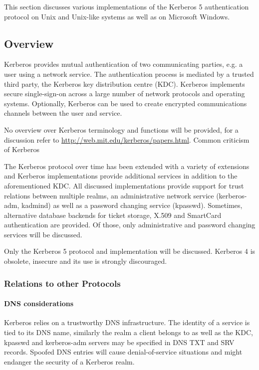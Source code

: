 This section discusses various implementations of the Kerberos 5 authentication protocol
on Unix and Unix-like systems as well as on Microsoft Windows. 

\subsection{Overview}
\label{subsection:kerberos_overview}

Kerberos provides mutual authentication of two communicating parties, e.g. a user using a network service. The authentication process is mediated by a trusted third party, the Kerberos key distribution centre (KDC). Kerberos implements secure single-sign-on across a large number of network protocols and operating systems. Optionally, Kerberos can be used to create encrypted communications channels between the user and service.

No overview over Kerberos terminology and functions will be provided, for a discussion refer to \url{http://web.mit.edu/kerberos/papers.html}. Common criticism of Kerberos 


The Kerberos protocol over time has been extended with a variety of extensions and Kerberos implementations provide additional services in addition to the aforementioned KDC. All discussed implementations provide support for trust relations between multiple realms, an administrative network service (kerberos-adm, kadmind) as well as a password changing service (kpasswd). Sometimes, alternative database backends for ticket storage, X.509 and SmartCard authentication are provided. Of those, only administrative and password changing services will be discussed.

Only the Kerberos 5 protocol and implementation will be discussed. Kerberos 4 is obsolete, insecure and its use is strongly discouraged.

\subsubsection{Relations to other Protocols}
\label{subsubsection:kerberos_relation_to_other_protocols}

\paragraph{DNS considerations}
Kerberos relies on a trustworthy DNS infrastructure. The identity of a service is tied to its DNS name, similarly the realm a client belongs to as well as the KDC, kpasswd and kerberos-adm servers may be specified in DNS TXT and SRV records. Spoofed DNS entries will cause denial-of-service situations and might endanger the security of a Kerberos realm.

